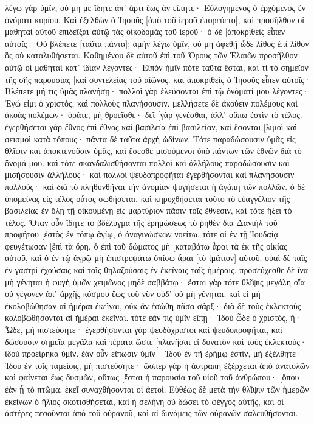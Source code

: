 λέγω γὰρ ὑμῖν, οὐ μή με ἴδητε ἀπ᾽ ἄρτι ἕως ἂν εἴπητε· Εὐλογημένος ὁ ἐρχόμενος ἐν ὀνόματι κυρίου. 
Καὶ ἐξελθὼν ὁ Ἰησοῦς [ἀπὸ τοῦ ἱεροῦ ἐπορεύετο], καὶ προσῆλθον οἱ μαθηταὶ αὐτοῦ ἐπιδεῖξαι αὐτῷ τὰς οἰκοδομὰς τοῦ ἱεροῦ· 
ὁ δὲ [ἀποκριθεὶς εἶπεν αὐτοῖς· Οὐ βλέπετε [ταῦτα πάντα]; ἀμὴν λέγω ὑμῖν, οὐ μὴ ἀφεθῇ ὧδε λίθος ἐπὶ λίθον ὃς οὐ καταλυθήσεται. 
Καθημένου δὲ αὐτοῦ ἐπὶ τοῦ Ὄρους τῶν Ἐλαιῶν προσῆλθον αὐτῷ οἱ μαθηταὶ κατ᾽ ἰδίαν λέγοντες· Εἰπὸν ἡμῖν πότε ταῦτα ἔσται, καὶ τί τὸ σημεῖον τῆς σῆς παρουσίας [καὶ συντελείας τοῦ αἰῶνος. 
καὶ ἀποκριθεὶς ὁ Ἰησοῦς εἶπεν αὐτοῖς· Βλέπετε μή τις ὑμᾶς πλανήσῃ· 
πολλοὶ γὰρ ἐλεύσονται ἐπὶ τῷ ὀνόματί μου λέγοντες· Ἐγώ εἰμι ὁ χριστός, καὶ πολλοὺς πλανήσουσιν. 
μελλήσετε δὲ ἀκούειν πολέμους καὶ ἀκοὰς πολέμων· ὁρᾶτε, μὴ θροεῖσθε· δεῖ [γὰρ γενέσθαι, ἀλλ᾽ οὔπω ἐστὶν τὸ τέλος. 
ἐγερθήσεται γὰρ ἔθνος ἐπὶ ἔθνος καὶ βασιλεία ἐπὶ βασιλείαν, καὶ ἔσονται [λιμοὶ καὶ σεισμοὶ κατὰ τόπους· 
πάντα δὲ ταῦτα ἀρχὴ ὠδίνων. 
Τότε παραδώσουσιν ὑμᾶς εἰς θλῖψιν καὶ ἀποκτενοῦσιν ὑμᾶς, καὶ ἔσεσθε μισούμενοι ὑπὸ πάντων τῶν ἐθνῶν διὰ τὸ ὄνομά μου. 
καὶ τότε σκανδαλισθήσονται πολλοὶ καὶ ἀλλήλους παραδώσουσιν καὶ μισήσουσιν ἀλλήλους· 
καὶ πολλοὶ ψευδοπροφῆται ἐγερθήσονται καὶ πλανήσουσιν πολλούς· 
καὶ διὰ τὸ πληθυνθῆναι τὴν ἀνομίαν ψυγήσεται ἡ ἀγάπη τῶν πολλῶν. 
ὁ δὲ ὑπομείνας εἰς τέλος οὗτος σωθήσεται. 
καὶ κηρυχθήσεται τοῦτο τὸ εὐαγγέλιον τῆς βασιλείας ἐν ὅλῃ τῇ οἰκουμένῃ εἰς μαρτύριον πᾶσιν τοῖς ἔθνεσιν, καὶ τότε ἥξει τὸ τέλος. 
Ὅταν οὖν ἴδητε τὸ βδέλυγμα τῆς ἐρημώσεως τὸ ῥηθὲν διὰ Δανιὴλ τοῦ προφήτου [ἑστὸς ἐν τόπῳ ἁγίῳ, ὁ ἀναγινώσκων νοείτω, 
τότε οἱ ἐν τῇ Ἰουδαίᾳ φευγέτωσαν [ἐπὶ τὰ ὄρη, 
ὁ ἐπὶ τοῦ δώματος μὴ [καταβάτω ἆραι τὰ ἐκ τῆς οἰκίας αὐτοῦ, 
καὶ ὁ ἐν τῷ ἀγρῷ μὴ ἐπιστρεψάτω ὀπίσω ἆραι [τὸ ἱμάτιον] αὐτοῦ. 
οὐαὶ δὲ ταῖς ἐν γαστρὶ ἐχούσαις καὶ ταῖς θηλαζούσαις ἐν ἐκείναις ταῖς ἡμέραις. 
προσεύχεσθε δὲ ἵνα μὴ γένηται ἡ φυγὴ ὑμῶν χειμῶνος μηδὲ σαββάτῳ· 
ἔσται γὰρ τότε θλῖψις μεγάλη οἵα οὐ γέγονεν ἀπ᾽ ἀρχῆς κόσμου ἕως τοῦ νῦν οὐδ᾽ οὐ μὴ γένηται. 
καὶ εἰ μὴ ἐκολοβώθησαν αἱ ἡμέραι ἐκεῖναι, οὐκ ἂν ἐσώθη πᾶσα σάρξ· διὰ δὲ τοὺς ἐκλεκτοὺς κολοβωθήσονται αἱ ἡμέραι ἐκεῖναι. 
τότε ἐάν τις ὑμῖν εἴπῃ· Ἰδοὺ ὧδε ὁ χριστός, ἤ· Ὧδε, μὴ πιστεύσητε· 
ἐγερθήσονται γὰρ ψευδόχριστοι καὶ ψευδοπροφῆται, καὶ δώσουσιν σημεῖα μεγάλα καὶ τέρατα ὥστε [πλανῆσαι εἰ δυνατὸν καὶ τοὺς ἐκλεκτούς· 
ἰδοὺ προείρηκα ὑμῖν. 
ἐὰν οὖν εἴπωσιν ὑμῖν· Ἰδοὺ ἐν τῇ ἐρήμῳ ἐστίν, μὴ ἐξέλθητε· Ἰδοὺ ἐν τοῖς ταμείοις, μὴ πιστεύσητε· 
ὥσπερ γὰρ ἡ ἀστραπὴ ἐξέρχεται ἀπὸ ἀνατολῶν καὶ φαίνεται ἕως δυσμῶν, οὕτως [ἔσται ἡ παρουσία τοῦ υἱοῦ τοῦ ἀνθρώπου· 
[ὅπου ἐὰν ᾖ τὸ πτῶμα, ἐκεῖ συναχθήσονται οἱ ἀετοί. 
Εὐθέως δὲ μετὰ τὴν θλῖψιν τῶν ἡμερῶν ἐκείνων ὁ ἥλιος σκοτισθήσεται, καὶ ἡ σελήνη οὐ δώσει τὸ φέγγος αὐτῆς, καὶ οἱ ἀστέρες πεσοῦνται ἀπὸ τοῦ οὐρανοῦ, καὶ αἱ δυνάμεις τῶν οὐρανῶν σαλευθήσονται. 
